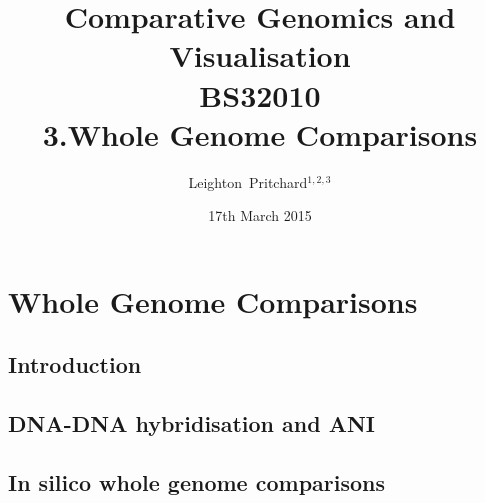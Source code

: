 

%



\title[Comparative Genomics and Visualisation: 3.Whole Genomes] %
{Comparative Genomics and \\ Visualisation \\
BS32010 \\
3.Whole Genome Comparisons}
\author[Pritchard] %
{Leighton~Pritchard$^{1,2,3}$}
\date[17th March 2015] %
{17th March 2015}
\subject{Bioinformatics, Genomics, Bacteria, Sequencing, Microbiology, Microbes, Comparative Genomics, Visualisation}





\frame[plain]{\titlepage}



\section{Whole Genome Comparisons}
\subsection{Introduction}

\subsection{DNA-DNA hybridisation and ANI}


\subsection{In silico whole genome comparisons}
%




